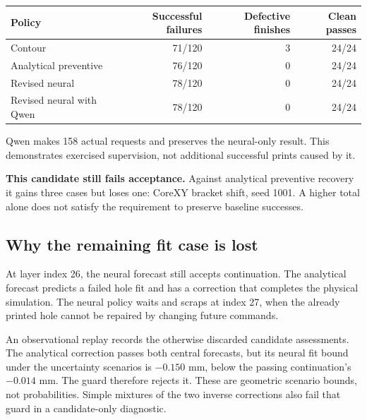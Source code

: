 \documentclass[10pt,letterpaper]{article}
\newcommand{\note}[1]{\begin{tcolorbox}[colback=pale,colframe=teal!55,boxrule=0.5pt,arc=2pt,left=8pt,right=8pt,top=5pt,bottom=5pt]#1\end{tcolorbox}}
\begin{document}
\begin{center}
\begin{tabularx}{\linewidth}{@{}Yrrr@{}}
\toprule
Policy & Successful failures & Defective finishes & Clean passes\\
\midrule
Contour & 71/120 & 3 & 24/24\\
Analytical preventive & 76/120 & 0 & 24/24\\
Revised neural & 78/120 & 0 & 24/24\\
Revised neural with Qwen & 78/120 & 0 & 24/24\\
\bottomrule
\end{tabularx}
\end{center}
Qwen makes 158 actual requests and preserves the neural-only result. This
demonstrates exercised supervision, not additional successful prints caused by it.

\note{\textbf{This candidate still fails acceptance.} Against analytical preventive
recovery it gains three cases but loses one: CoreXY bracket shift, seed 1001.
A higher total alone does not satisfy the requirement to preserve baseline successes.}

\subsection*{Why the remaining fit case is lost}
At layer index 26, the neural forecast still accepts continuation. The analytical
forecast predicts a failed hole fit and has a correction that completes the
physical simulation. The neural policy waits and scraps at index 27, when the
already printed hole cannot be repaired by changing future commands.

An observational replay records the otherwise discarded candidate assessments.
The analytical correction passes both central forecasts, but its neural fit bound
under the uncertainty scenarios is $-0.150$ mm, below the passing continuation's
$-0.014$ mm. The guard therefore rejects it. These are geometric scenario bounds,
not probabilities. Simple mixtures of the two inverse corrections also fail
that guard in a candidate-only diagnostic.
\end{document}
